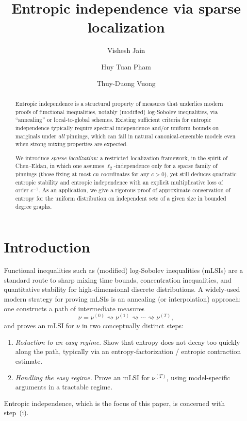 \documentclass[11pt,reqno,letterpaper]{amsart}
\title{Entropic independence via sparse localization}
\author[A1]{Vishesh Jain}
\author[A2]{Huy Tuan Pham}
\author[A3]{Thuy-Duong Vuong}
\numberwithin{equation}{section}
\theoremstyle{definition}
\begin{document}
\begin{abstract}
Entropic independence is a structural property of measures that underlies modern proofs of functional inequalities, notably (modified) log-Sobolev inequalities, via ``annealing'' or local-to-global schemes.  Existing sufficient criteria for entropic independence typically require spectral independence and/or uniform bounds on marginals under \emph{all} pinnings, which can fail in natural canonical-ensemble models even when strong mixing properties are expected.

We introduce \emph{sparse localization}: a restricted localization framework, in the spirit of Chen--Eldan, in which one assumes $\ell_2$-independence only for a sparse family of pinnings (those fixing at most $cn$ coordinates for any $c > 0$), yet still deduces quadratic entropic stability and entropic independence with an explicit multiplicative loss of order $c^{-1}$. As an application, we give a rigorous proof of approximate conservation of entropy for the uniform distribution on independent sets of a given size in bounded degree graphs. 

\end{abstract}

\maketitle
 



\section{Introduction}
\label{sec:intro}

Functional inequalities such as (modified) log-Sobolev inequalities (mLSIs) are a standard route to sharp
mixing time bounds, concentration inequalities, and quantitative stability for high-dimensional discrete
distributions.
A widely-used modern strategy for proving mLSIs is an {annealing} (or {interpolation}) approach:
one constructs a path of intermediate measures
\[
\nu=\nu^{(0)} \rightsquigarrow \nu^{(1)} \rightsquigarrow \cdots \rightsquigarrow \nu^{(T)},
\]
and proves an mLSI for $\nu$ in two conceptually distinct steps:
\begin{enumerate}[label=(\roman*),leftmargin=2.2em]
    \item \emph{Reduction to an easy regime.} Show that entropy does not decay too quickly along the path,
    typically via an entropy-factorization / entropic contraction estimate.
    \item \emph{Handling the easy regime.} Prove an mLSI for $\nu^{(T)}$,
    using model-specific arguments in a tractable regime.
\end{enumerate}
Entropic independence, which is the focus of this paper, is concerned with step~(i). 
\end{document}
